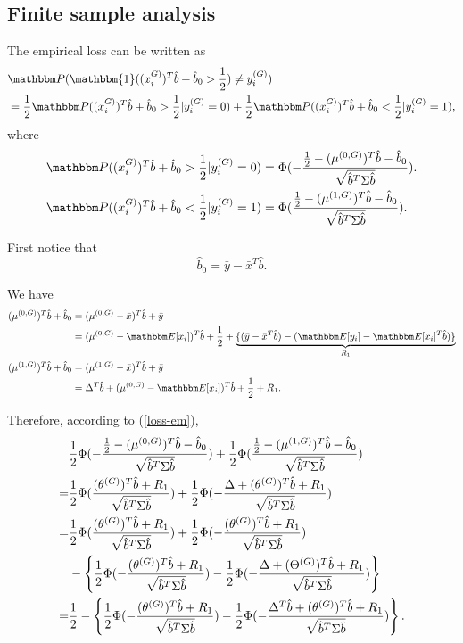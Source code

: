 \subsection{Finite sample analysis}
The empirical loss can be written as
\begin{align}
    \label{loss-em}
    &\P(\mathbbm{1}((x_i^{G)})^T\hat{b}+\hat{b}_0>\frac{1}{2})\neq y_i^{(G)})\\
   & =\frac{1}{2}\P((x_i^{G)})^T\hat{b}+\hat{b}_0>\frac{1}{2}|y_i^{(G)}=0)+\frac{1}{2}\P((x_i^{G)})^T\hat{b}+\hat{b}_0<\frac{1}{2}|y_i^{(G)}=1),\nonumber
\end{align}
where
\begin{align*}
    &\P((x_i^{G)})^T\hat{b}+\hat{b}_0>\frac{1}{2}|y_i^{(G)}=0)=\Phi(-\frac{\frac{1}{2}-(\mu^{(0,G)})^T\hat{b}-\hat{b}_0}{\sqrt{\hat{b}^T\Sig \hat{b}}}).\\
    &\P((x_i^{G)})^T\hat{b}+\hat{b}_0<\frac{1}{2}|y_i^{(G)}=1)=\Phi(\frac{\frac{1}{2}-(\mu^{(1,G)})^T\hat{b}-\hat{b}_0}{\sqrt{\hat{b}^T\Sig \hat{b}}}).
\end{align*}

First notice that
\[
  \hat{b}_0=\bar{y}-\bar{x}^T\hat{b}.
\]

We have
\begin{align*}
(\mu^{(0,G)})^T\hat{b}+\hat{b}_0&=(\mu^{(0,G)}-\bar{x})^T\hat{b}+\bar{y}\\
&=(\mu^{(0,G)}-\E[x_i])^T\hat{b}+\frac{1}{2}+\underbrace{\{(\bar{y}-\bar{x}^T\hat{b})-(\E[y_i]-\E[x_i]^T\hat{b})\}}_{R_1}\\
(\mu^{(1,G)})^T\hat{b}+\hat{b}_0&=(\mu^{(1,G)}-\bar{x})^T\hat{b}+\bar{y}\\
&=\Delta^T\hat{b}+(\mu^{(0,G)}-\E[x_i])^T\hat{b}+\frac{1}{2}+R_1.
\end{align*}


Therefore, according to (\ref{loss-em}),
\begin{align*}
   & \frac{1}{2}\Phi(-\frac{\frac{1}{2}-(\mu^{(0,G)})^T\hat{b}-\hat{b}_0}{\sqrt{\hat{b}^T\Sigma \hat{b}}})+\frac{1}{2}\Phi(\frac{\frac{1}{2}-(\mu^{(1,G)})^T\hat{b}-\hat{b}_0}{\sqrt{\hat{b}^T\Sigma \hat{b}}})\\
    =&\frac{1}{2}\Phi(\frac{(\theta^{(G)})^T\hat{b}+R_1}{\sqrt{\hat{b}^T\Sigma \hat{b}}})+\frac{1}{2}\Phi(-\frac{\Delta+(\theta^{(G)})^T\hat{b}+R_1}{\sqrt{\hat{b}^T\Sigma \hat{b}}})\\
    =&\frac{1}{2}\Phi(\frac{(\theta^{(G)})^T\hat{b}+R_1}{\sqrt{\hat{b}^T\Sigma \hat{b}}})+\frac{1}{2}\Phi(-\frac{(\theta^{(G)})^T\hat{b}+R_1}{\sqrt{\hat{b}^T\Sigma \hat{b}}})\\
    &-\left\{\frac{1}{2}\Phi(-\frac{(\theta^{(G)})^T\hat{b}+R_1}{\sqrt{\hat{b}^T\Sigma \hat{b}}})-\frac{1}{2}\Phi(-\frac{\Delta+(\Theta^{(G)})^T\hat{b}+R_1}{\sqrt{\hat{b}^T\Sigma \hat{b}}})\right\}\\
    =&\frac{1}{2}-\left\{\frac{1}{2}\Phi(-\frac{(\theta^{(G)})^T\hat{b}+R_1}{\sqrt{\hat{b}^T\Sigma \hat{b}}})-\frac{1}{2}\Phi(-\frac{\Delta^T\hat{b}+(\theta^{(G)})^T\hat{b}+R_1}{\sqrt{\hat{b}^T\Sigma \hat{b}}})\right\}.
\end{align*}


